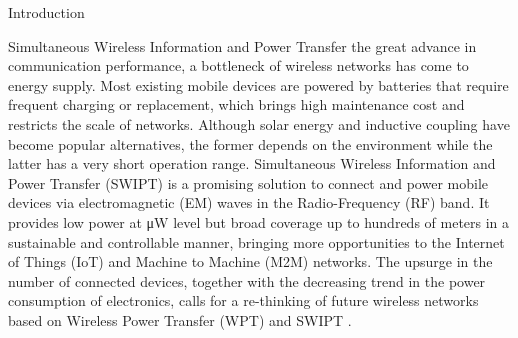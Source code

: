 \documentclass[journal]{IEEEtran}
\begin{document}
	\begin{section}{Introduction}
		\begin{subsection}{Simultaneous Wireless Information and Power Transfer}
			 the great advance in communication performance, a bottleneck of wireless networks has come to energy supply. Most existing mobile devices are powered by batteries that require frequent charging or replacement, which brings high maintenance cost and restricts the scale of networks. Although solar energy and inductive coupling have become popular alternatives, the former depends on the environment while the latter has a very short operation range. Simultaneous Wireless Information and Power Transfer (SWIPT) is a promising solution to connect and power mobile devices via electromagnetic (EM) waves in the Radio-Frequency (RF) band. It provides low power at \si{\uW} level but broad coverage up to hundreds of meters in a sustainable and controllable manner, bringing more opportunities to the Internet of Things (IoT) and Machine to Machine (M2M) networks. The upsurge in the number of connected devices, together with the decreasing trend in the power consumption of electronics, calls for a re-thinking of future wireless networks based on Wireless Power Transfer (WPT) and SWIPT \cite{Clerckx2019}.


\end{subsection}
\end{section}
\end{document}
